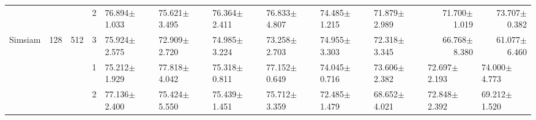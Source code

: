 \begin{table}[htpb]
{\begin{tabular}{c|c|c|c|ll|ll|ll|ll}
                                 &                                                                                 &                                                                                        & 2                                                                                         & 76.894$\pm$1.033                        & 75.621$\pm$3.495                        & 76.364$\pm$2.411                        & 76.833$\pm$4.807                        & 74.485$\pm$1.215                        & 71.879$\pm$2.989                        & \multicolumn{1}{r}{71.700$\pm$1.019}    & \multicolumn{1}{r}{73.707$\pm$0.382}   \\
\multirow{-12}{*}{Simsiam}       & \multirow{-6}{*}{128}                                                           & \multirow{-3}{*}{512}                                                                  & 3                                                                                         & 75.924$\pm$2.575                        & 72.909$\pm$2.720                        & 74.985$\pm$3.224                        & 73.258$\pm$2.703                        & 74.955$\pm$3.303                        & 72.318$\pm$3.345                        & \multicolumn{1}{r}{66.768$\pm$8.380}    & \multicolumn{1}{r}{61.077$\pm$6.460}   \\ \hline
                                 &                                                                                 &                                                                                        & 1                                                                                         & 75.212$\pm$1.929                        & 77.818$\pm$4.042                        & 75.318$\pm$0.811                        & 77.152$\pm$0.649                        & 74.045$\pm$0.716                        & 73.606$\pm$2.382                        & 72.697$\pm$2.193                        & 74.000$\pm$4.773                       \\
                                 &                                                                                 &                                                                                        & 2                                                                                         & 77.136$\pm$2.400                        & 75.424$\pm$5.550                        & 75.439$\pm$1.451                        & 75.712$\pm$3.359                        & 72.485$\pm$1.479                        & 68.652$\pm$4.021                        & 72.848$\pm$2.392                        & 69.212$\pm$1.520                       \\

\end{tabular}}
\end{table}
